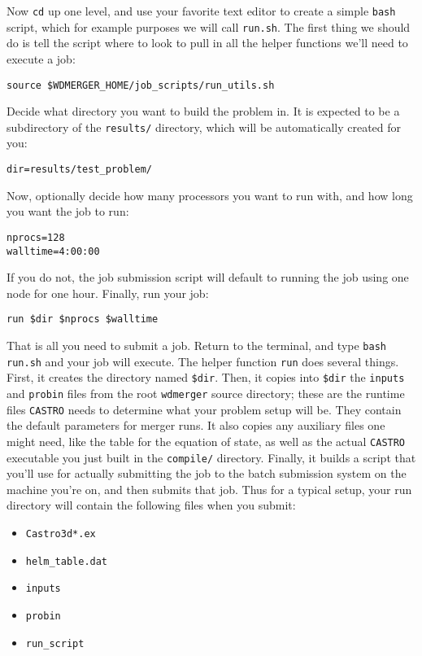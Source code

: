 \documentclass[12pt]{book}
\begin{document}
Now \texttt{cd} up one level, and use your favorite text editor to create a simple 
\texttt{bash} script, which for example purposes we will call \texttt{run.sh}.
The first thing we should do is tell the script where to look to pull in 
all the helper functions we'll need to execute a job:

\begin{lstlisting}
source $WDMERGER_HOME/job_scripts/run_utils.sh
\end{lstlisting}%

Decide what directory you want to build the problem in. It is expected 
to be a subdirectory of the \texttt{results/} directory, which will be
automatically created for you:
\begin{lstlisting}
dir=results/test_problem/
\end{lstlisting}
Now, optionally decide how many processors you want to run with, and 
how long you want the job to run:
\begin{lstlisting}
nprocs=128
walltime=4:00:00
\end{lstlisting}
If you do not, the job submission script will default to running the job
using one node for one hour. Finally, run your job:
\begin{lstlisting}
run $dir $nprocs $walltime
\end{lstlisting}%
That is all you need to submit a job. Return to the terminal, and type \texttt{bash run.sh}
and your job will execute. The helper function \texttt{run} does several things. First, 
it creates the directory named \texttt{\$dir}. Then, it copies into \texttt{\$dir} the \texttt{inputs}
and \texttt{probin} files from the root \texttt{wdmerger} source directory; these are the runtime
files \texttt{CASTRO} needs to determine what your problem setup will be. They contain the default 
parameters for merger runs. It also copies any auxiliary files one might need, like the 
table for the equation of state, as well as the actual \texttt{CASTRO} executable you just built in the 
\texttt{compile/} directory. Finally, it builds a script that you'll use for actually submitting 
the job to the batch submission system on the machine you're on, and then submits that job. 
Thus for a typical setup, your run directory will contain the following files when you submit:
\begin{itemize}
  \item \texttt{Castro3d*.ex}
  \item \texttt{helm\_table.dat}
  \item \texttt{inputs}
  \item \texttt{probin}
  \item \texttt{run\_script}
\end{itemize}
\end{document}

